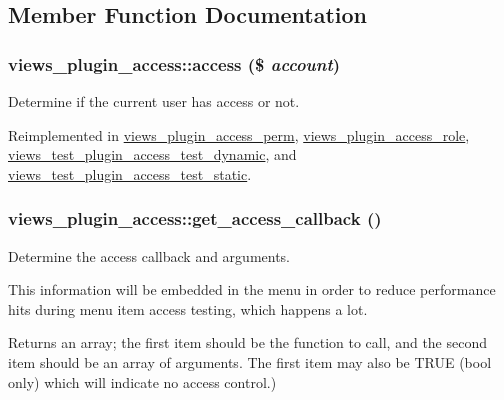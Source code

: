 \subsection{Member Function Documentation}
\hypertarget{classviews__plugin__access_ad24d38c1b1a1bd7527b2b96a2103cede}{
\subsubsection[{access}]{\setlength{\rightskip}{0pt plus 5cm}views\_\-plugin\_\-access::access (\$ {\em account})}}
\label{classviews__plugin__access_ad24d38c1b1a1bd7527b2b96a2103cede}
Determine if the current user has access or not. 

Reimplemented in \hyperlink{classviews__plugin__access__perm_ac5b655153815ade74513b1af48c18cad}{views\_\-plugin\_\-access\_\-perm}, \hyperlink{classviews__plugin__access__role_a8de6032d940b90e06820cdbd9a15a51c}{views\_\-plugin\_\-access\_\-role}, \hyperlink{classviews__test__plugin__access__test__dynamic_a44a0d68fea7b88011bd5bea488ae982f}{views\_\-test\_\-plugin\_\-access\_\-test\_\-dynamic}, and \hyperlink{classviews__test__plugin__access__test__static_acb7d4c26172324fed2bf8e610f375b88}{views\_\-test\_\-plugin\_\-access\_\-test\_\-static}.\hypertarget{classviews__plugin__access_ad4038a32fccc6a662a74f437d0bf6a23}{
\subsubsection[{get\_\-access\_\-callback}]{\setlength{\rightskip}{0pt plus 5cm}views\_\-plugin\_\-access::get\_\-access\_\-callback ()}}
\label{classviews__plugin__access_ad4038a32fccc6a662a74f437d0bf6a23}
Determine the access callback and arguments.

This information will be embedded in the menu in order to reduce performance hits during menu item access testing, which happens a lot.

\begin{DoxyReturn}{Returns}
an array; the first item should be the function to call, and the second item should be an array of arguments. The first item may also be TRUE (bool only) which will indicate no access control.) 
\end{DoxyReturn}


